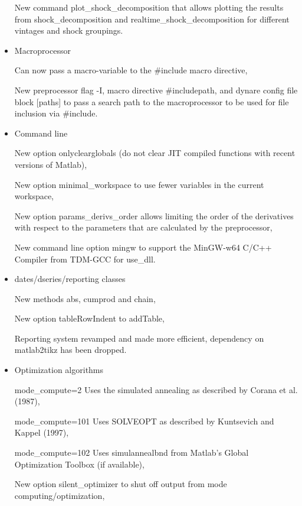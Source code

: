 \documentclass[10pt,math=newtx,citestyle=gb7714-2015,bibstyle=gb7714-2015]{elegantbook}
\begin{document}
\begin{itemize}
		
		New command plot\_shock\_decomposition that allows plotting the results from shock\_decomposition and realtime\_shock\_decomposition for different vintages and shock groupings.
		
		
		
		
		\item Macroprocessor
		
		
		Can now pass a macro-variable to the \@\#include macro directive,
		
		
		New preprocessor flag -I, macro directive \@\#includepath, and dynare config file block [paths] to pass a search path to the macroprocessor to be used for file inclusion via \@\#include.
		
		
		
		
		\item Command line
		
		
		New option onlyclearglobals (do not clear JIT compiled functions with recent versions of Matlab),
		
		
		New option minimal\_workspace to use fewer variables in the current workspace,
		
		
		New option params\_derivs\_order allows limiting the order of the derivatives with respect to the parameters that are calculated by the preprocessor,
		
		
		New command line option mingw to support the MinGW-w64 C/C++ Compiler from TDM-GCC for use\_dll.
		
		
		
		
		\item dates/dseries/reporting classes
		
		
		New methods abs, cumprod and chain,
		
		
		New option tableRowIndent to addTable,
		
		
		Reporting system revamped and made more efficient, dependency on matlab2tikz has been dropped.
		
		
		
		
		\item Optimization algorithms
		
		
		mode\_compute=2 Uses the simulated annealing as described by Corana et al. (1987),
		
		
		mode\_compute=101 Uses SOLVEOPT as described by Kuntsevich and Kappel (1997),
		
		
		mode\_compute=102 Uses simulannealbnd from Matlab's Global Optimization Toolbox (if available),
		
		
		New option silent\_optimizer to shut off output from mode computing/optimization,
		

\end{itemize}
\end{document}
